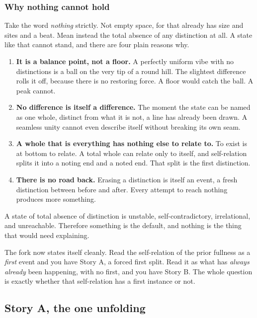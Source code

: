 \subsubsection{Why nothing cannot hold}

Take the word \emph{nothing} strictly. Not empty space, for that already has size and sites and a beat. Mean instead the total absence of any distinction at all. A state like that cannot stand, and there are four plain reasons why.

\begin{enumerate}
\item \textbf{It is a balance point, not a floor.} A perfectly uniform vibe with no distinctions is a ball on the very tip of a round hill. The slightest difference rolls it off, because there is no restoring force. A floor would catch the ball. A peak cannot.
\item \textbf{No difference is itself a difference.} The moment the state can be named as one whole, distinct from what it is not, a line has already been drawn. A seamless unity cannot even describe itself without breaking its own seam.
\item \textbf{A whole that is everything has nothing else to relate to.} To exist is at bottom to relate. A total whole can relate only to itself, and self-relation splits it into a noting end and a noted end. That split is the first distinction.
\item \textbf{There is no road back.} Erasing a distinction is itself an event, a fresh distinction between before and after. Every attempt to reach nothing produces more something.
\end{enumerate}

\begin{proposition}
A state of total absence of distinction is unstable, self-contradictory, irrelational, and unreachable. Therefore something is the default, and nothing is the thing that would need explaining.
\end{proposition}

The fork now states itself cleanly. Read the self-relation of the prior fullness as a \emph{first} event and you have Story A, a forced first split. Read it as what has \emph{always already} been happening, with no first, and you have Story B. The whole question is exactly whether that self-relation has a first instance or not.

\subsection{Story A, the one unfolding}

